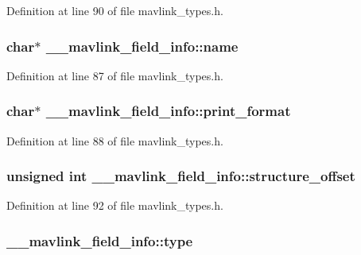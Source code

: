 Definition at line 90 of file mavlink\-\_\-types.\-h.

\hypertarget{struct____mavlink__field__info_a09193c7acc510180ecf6f944381e53c2}{
\subsubsection[{name}]{ char$\ast$ \-\_\-\-\_\-mavlink\-\_\-field\-\_\-info\-::name}}\label{struct____mavlink__field__info_a09193c7acc510180ecf6f944381e53c2}


Definition at line 87 of file mavlink\-\_\-types.\-h.

\hypertarget{struct____mavlink__field__info_af3fc635b6e03851bb683c0c3d57dfc12}{
\subsubsection[{print\-\_\-format}]{ char$\ast$ \-\_\-\-\_\-mavlink\-\_\-field\-\_\-info\-::print\-\_\-format}}\label{struct____mavlink__field__info_af3fc635b6e03851bb683c0c3d57dfc12}


Definition at line 88 of file mavlink\-\_\-types.\-h.

\hypertarget{struct____mavlink__field__info_acb947cd22e51e70e8b5f677b543196ac}{
\subsubsection[{structure\-\_\-offset}]{\setlength{\rightskip}{0pt plus 5cm}unsigned int \-\_\-\-\_\-mavlink\-\_\-field\-\_\-info\-::structure\-\_\-offset}}\label{struct____mavlink__field__info_acb947cd22e51e70e8b5f677b543196ac}


Definition at line 92 of file mavlink\-\_\-types.\-h.

\hypertarget{struct____mavlink__field__info_a32f98e7c869ae1567c4ad366c74b6552}{
\subsubsection[{type}]{ \-\_\-\-\_\-mavlink\-\_\-field\-\_\-info\-::type}}\label{struct____mavlink__field__info_a32f98e7c869ae1567c4ad366c74b6552}


